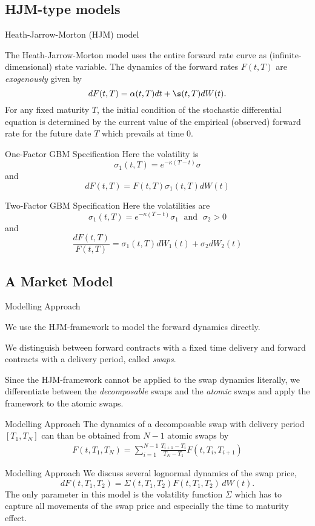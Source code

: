 \subsection{HJM-type models}

{ Heath-Jarrow-Morton (HJM) model}

The Heath-Jarrow-Morton model uses the entire forward rate curve as
(infinite-dimensional) state variable. The dynamics of the forward rates $F(t,T)$ are {\it exogenously} given by
$$
dF(t,T) = \alpha(t,T) dt + \s(t,T) dW(t).
$$
For any fixed maturity $T$, the
initial condition of the stochastic differential equation
is determined by the current value
of the empirical (observed) forward rate for the future date $T$
which prevails at time $0$.

{One-Factor GBM Specification}
Here the volatility is
$$
\sigma_1(t,T)=e^{-\kappa (T-t)}\sigma
$$
and
$$
dF(t,T)=F(t,T)\sigma_1(t,T)dW(t)
$$

{Two-Factor GBM Specification}
Here the volatilities are
$$
\sigma_1(t,T)=e^{-\kappa (T-t)}\sigma_1 \; \mbox{ and } \; \sigma_2>0
$$
and
$$
\frac{dF(t,T)}{F(t,T)}=\sigma_1(t,T)dW_1(t)+\sigma_2dW_2(t)
$$

\subsection{A Market Model}

{Modelling Approach}
\item<1-> We use the HJM-framework to model the forward dynamics directly.
\item<2-> We distinguish between forward contracts with a fixed time delivery and forward contracts with a delivery period, called \emph{swaps}.
\item<3-> Since the HJM-framework cannot be applied to the swap dynamics literally, we differentiate between the \emph{decomposable} swaps and the \emph{atomic} swaps and apply the framework to the atomic swaps.

{Modelling Approach}
The dynamics of a decomposable swap with delivery period $[T_1,T_{N}]$ can than be obtained from $N-1$ atomic swaps by
\begin{align}
F(t,T_1,T_N)=\sum\limits_{i=1}^{N-1} \frac{T_{i+1}-T_i}{T_N-T_1} F(t,T_i,T_{i+1})\label{eqn: decomposbale swap}
\end{align}

{Modelling Approach}
We discuss several lognormal dynamics of the swap price,
\begin{equation}
dF(t,T_1,T_2)=\Sigma(t,T_1,T_2)F(t,T_1,T_2)\, dW(t). \label{eqn: lognormal dynamics}
\end{equation}
The only parameter in this model is the volatility function $\Sigma$ which has to capture all movements of the swap price and especially the time to maturity effect.


